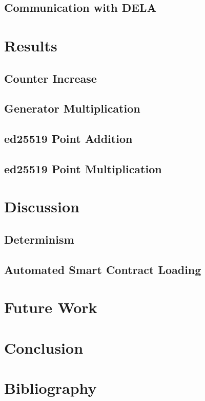 \documentclass[11pt, a4paper, twoside, openright]{article}
\begin{document}
\subsection{Communication with DELA}


\section{Results}

\subsection{Counter Increase}

\subsection{Generator Multiplication}

\subsection{ed25519 Point Addition}

\subsection{ed25519 Point Multiplication}

\section{Discussion}

\subsection{Determinism}

\subsection{Automated Smart Contract Loading}


\section{Future Work}

\section{Conclusion}
\newpage
\section{Bibliography}


\end{document}
